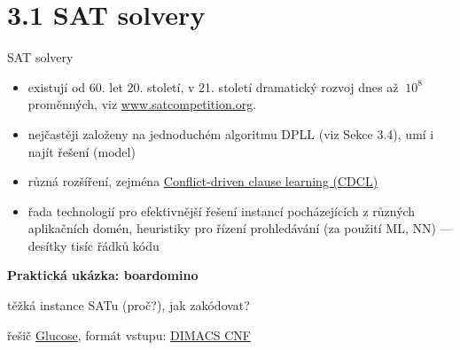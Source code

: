 \documentclass{beamer}
\begin{document}
\section{3.1 SAT solvery}


\begin{frame}{SAT solvery}

    \begin{itemize}
        \item existují od 60. let 20. století, v 21. století dramatický rozvoj dnes až $~10^8$ proměnných, viz \href{http://www.satcompetition.org}{\alert{www.satcompetition.org}}.\pause
        \item nejčastěji založeny na jednoduchém \alert{algoritmu DPLL} (viz Sekce 3.4), umí i najít řešení (model)\pause
        \item různá rozšíření, zejména \href{https://en.wikipedia.org/wiki/Conflict-driven_clause_learning}{\alert{Conflict-driven clause learning (CDCL)}}\pause
        \item řada technologií pro efektivnější řešení instancí pocházejících z různých aplikačních domén, heuristiky pro řízení prohledávání (za použití ML, NN) --- desítky tisíc řádků kódu
    \end{itemize}
    
    \pause
    \textbf{Praktická ukázka: boardomino}

    \smallskip


    \smallskip

    \pause
    těžká instance SATu (proč?), jak zakódovat? 
    
    \pause
    řešič \href{http://www.labri.fr/perso/lsimon/glucose/}{\alert{Glucose}}, formát vstupu: \href{http://people.sc.fsu.edu/~jburkardt/data/cnf/cnf.html}{\alert{DIMACS CNF}}
    
\end{frame}
\end{document}
